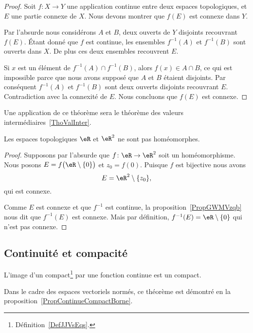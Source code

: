 \begin{proof}
	Soit \( f\colon X\to Y\) une application continue entre deux espaces topologiques, et \( E\) une partie connexe de \( X\). Nous devons montrer que \( f(E)\) est connexe dans \( Y\).

	Par l'absurde nous considérons \( A\) et \( B\), deux ouverts de \( Y\) disjoints recouvrant \( f(E)\). Étant donné que \( f\) est continue, les ensembles \( f^{-1}(A)\) et \( f^{-1}(B)\) sont ouverts dans \( X\). De plus ces deux ensembles recouvrent \( E\).

	Si \( x\) est un élément de \( f^{-1}(A)\cap f^{-1}(B)\), alors \( f(x)\in A\cap B\), ce qui est impossible parce que nous avons supposé que \( A\) et \( B\) étaient disjoints. Par conséquent \( f^{-1}(A)\) et \( f^{-1}(B)\) sont deux ouverts disjoints recouvrant \( E\). Contradiction avec la connexité de \( E\). Nous concluons que \( f(E)\) est connexe.
\end{proof}
Une application de ce théorème sera le théorème des valeurs intermédiaires~\ref{ThoValInter}.

\begin{example}
	Les espaces topologiques \( \eR\) et \( \eR^2\) ne sont pas homéomorphes.
\end{example}

\begin{proof}
	Supposons par l'absurde que \( f\colon \eR\to \eR^2\) soit un  homéomorphisme. Nous posons \( E=f\big( \eR\setminus\{ 0 \} \big)\) et \( z_0=f(0)\). Puisque \( f\) est bijective nous avons
	\begin{equation}
		E=\eR^2\setminus\{ z_0 \},
	\end{equation}
	qui est connexe.

	Comme \( E\) est connexe et que \( f^{-1}\) est continue, la proposition~\ref{PropGWMVzqb} nous dit que \( f^{-1}(E)\) est connexe. Mais par définition, \( f^{-1}(E)=\eR\setminus\{ 0 \}\) qui n'est pas connexe.
\end{proof}

\subsection{Continuité et compacité}

\begin{theorem}     \label{ThoImCompCotComp}
	L'image d'un compact\footnote{Définition~\ref{DefJJVsEqs}.} par une fonction continue est un compact.
\end{theorem}
Dans le cadre des espaces vectoriels normés, ce théorème est démontré en la proposition~\ref{PropContinueCompactBorne}.

